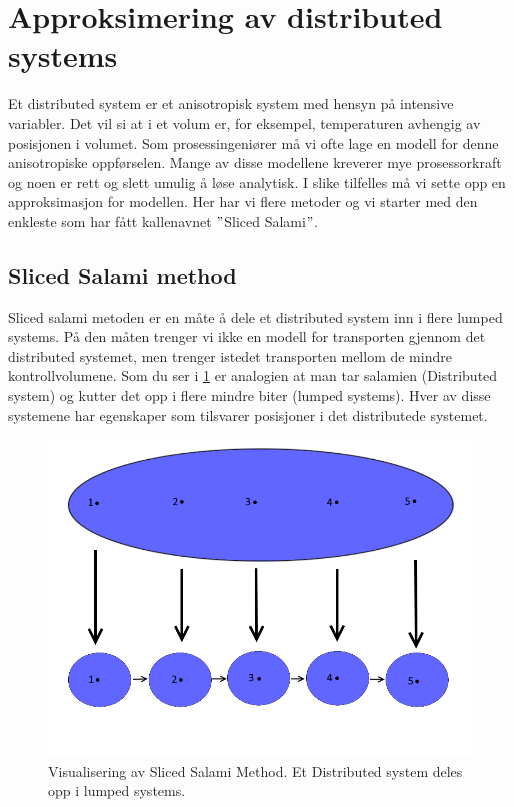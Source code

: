 \clearpage
\section{Approksimering av distributed systems}\label{sec:distributed}
Et distributed system er et anisotropisk system med hensyn på intensive variabler. Det vil si at i et volum er, for eksempel, temperaturen avhengig av posisjonen i volumet. Som prosessingeniører må vi ofte lage en modell for denne anisotropiske oppførselen. Mange av disse modellene kreverer mye prosessorkraft og noen er rett og slett umulig å løse analytisk. I slike tilfelles må vi sette opp en approksimasjon for modellen. Her har vi flere metoder og vi starter med den enkleste som har fått kallenavnet $"$Sliced Salami$"$.

\subsection{Sliced Salami method}
Sliced salami metoden er en måte å dele et distributed system inn i flere lumped systems. På den måten trenger vi ikke en modell for transporten gjennom det distributed systemet, men trenger istedet transporten mellom de mindre kontrollvolumene. Som du ser i \cref{fig:Sliced_salami} er analogien at man tar salamien (Distributed system) og kutter det opp i flere mindre biter (lumped systems). Hver av disse systemene har egenskaper som tilsvarer posisjoner i det distributede systemet. 

\begin{figure}[H]
    \centering
    \includegraphics[scale=0.4]{Figures/sliced_salami_method.png}
    \caption{Visualisering av Sliced Salami Method. Et Distributed system deles opp i lumped systems.}
    \label{fig:Sliced_salami}
\end{figure}

